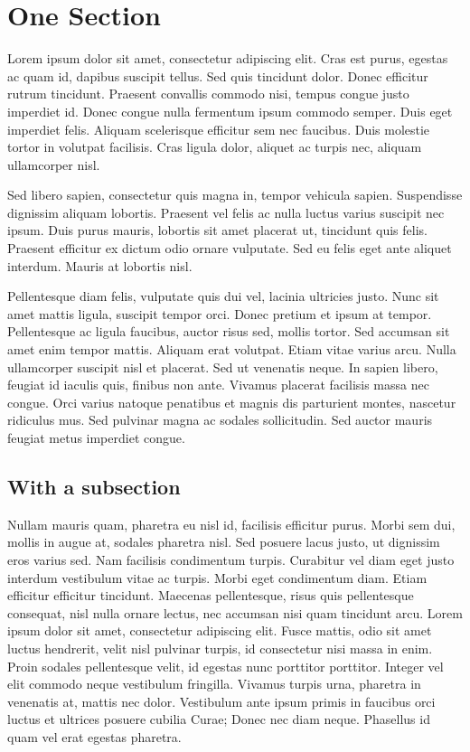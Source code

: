 
\section{One Section}

Lorem ipsum dolor sit amet, consectetur adipiscing elit. Cras est
purus, egestas ac quam id, dapibus suscipit tellus. Sed quis tincidunt
dolor. Donec efficitur rutrum tincidunt. Praesent convallis commodo
nisi, tempus congue justo imperdiet id. Donec congue nulla fermentum
ipsum commodo semper. Duis eget imperdiet felis. Aliquam scelerisque
efficitur sem nec faucibus. Duis molestie tortor in volutpat
facilisis. Cras ligula dolor, aliquet ac turpis nec, aliquam
ullamcorper nisl.

Sed libero sapien, consectetur quis magna in, tempor vehicula
sapien. Suspendisse dignissim aliquam lobortis. Praesent vel felis ac
nulla luctus varius suscipit nec ipsum. Duis purus mauris, lobortis
sit amet placerat ut, tincidunt quis felis. Praesent efficitur ex
dictum odio ornare vulputate. Sed eu felis eget ante aliquet
interdum. Mauris at lobortis nisl.

Pellentesque diam felis, vulputate quis dui vel, lacinia ultricies
justo. Nunc sit amet mattis ligula, suscipit tempor orci. Donec
pretium et ipsum at tempor. Pellentesque ac ligula faucibus, auctor
risus sed, mollis tortor. Sed accumsan sit amet enim tempor
mattis. Aliquam erat volutpat. Etiam vitae varius arcu. Nulla
ullamcorper suscipit nisl et placerat. Sed ut venenatis neque. In
sapien libero, feugiat id iaculis quis, finibus non ante. Vivamus
placerat facilisis massa nec congue. Orci varius natoque penatibus et
magnis dis parturient montes, nascetur ridiculus mus. Sed pulvinar
magna ac sodales sollicitudin. Sed auctor mauris feugiat metus
imperdiet congue.

\subsection{With a subsection}
Nullam mauris quam, pharetra eu nisl id, facilisis efficitur
purus. Morbi sem dui, mollis in augue at, sodales pharetra nisl. Sed
posuere lacus justo, ut dignissim eros varius sed. Nam facilisis
condimentum turpis. Curabitur vel diam eget justo interdum vestibulum
vitae ac turpis. Morbi eget condimentum diam. Etiam efficitur
efficitur tincidunt. Maecenas pellentesque, risus quis pellentesque
consequat, nisl nulla ornare lectus, nec accumsan nisi quam tincidunt
arcu. Lorem ipsum dolor sit amet, consectetur adipiscing elit. Fusce
mattis, odio sit amet luctus hendrerit, velit nisl pulvinar turpis, id
consectetur nisi massa in enim. Proin sodales pellentesque velit, id
egestas nunc porttitor porttitor. Integer vel elit commodo neque
vestibulum fringilla. Vivamus turpis urna, pharetra in venenatis at,
mattis nec dolor. Vestibulum ante ipsum primis in faucibus orci luctus
et ultrices posuere cubilia Curae; Donec nec diam neque. Phasellus id
quam vel erat egestas pharetra.

